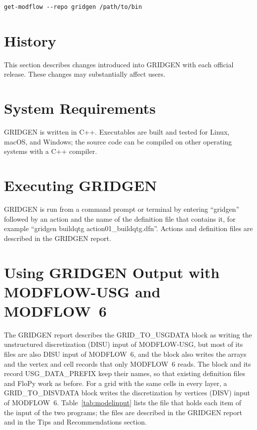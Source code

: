 \documentclass[11pt,twoside,twocolumn]{usgsreport}
\begin{document}
\begin{verbatim}
get-modflow --repo gridgen /path/to/bin
\end{verbatim}

\section{History}

This section describes changes introduced into GRIDGEN with each official release. These changes may substantially affect users.

\begin{itemize}
  
  
  
  
  
\end{itemize}

\section{System Requirements}

GRIDGEN is written in C++. Executables are built and tested for Linux, macOS, and Windows; the source code can be compiled on other operating systems with a C++ compiler.

\section{Executing GRIDGEN}

GRIDGEN is run from a command prompt or terminal by entering ``gridgen'' followed by an action and the name of the definition file that contains it, for example ``gridgen buildqtg action01\_buildqtg.dfn''. Actions and definition files are described in the GRIDGEN report.

\section{Using GRIDGEN Output with MODFLOW-USG and MODFLOW~6}

The GRIDGEN report describes the GRID\_TO\_USGDATA block as writing the unstructured discretization (DISU) input of MODFLOW-USG, but most of its files are also DISU input of MODFLOW~6, and the block also writes the arrays and the vertex and cell records that only MODFLOW~6 reads. The block and its record USG\_DATA\_PREFIX keep their names, so that existing definition files and FloPy work as before. For a grid with the same cells in every layer, a GRID\_TO\_DISVDATA block writes the discretization by vertices (DISV) input of MODFLOW~6. Table~\ref{tab:modelinput} lists the file that holds each item of the input of the two programs; the files are described in the GRIDGEN report and in the Tips and Recommendations section.
\end{document}
